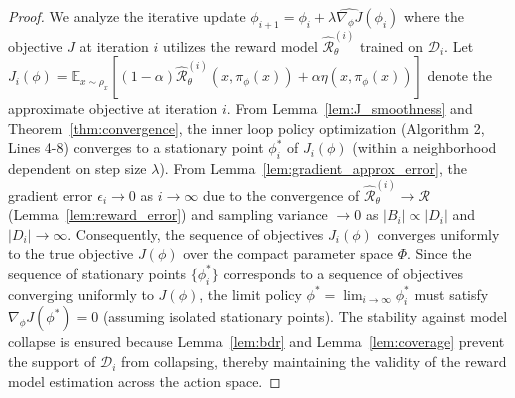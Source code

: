 \documentclass[./dissertation.tex]{subfiles}
\begin{document}
\begin{proof} 
We analyze the iterative update $\phi_{i+1} = \phi_i + \lambda \widehat{\nabla_\phi J}(\phi_i)$ where the objective $J$ at iteration $i$ utilizes the reward model $\hat{\mathcal{R}}_\theta^{(i)}$ trained on $\mathcal{D}_i$.
Let $J_i(\phi) = \mathbb{E}_{x \sim \rho_x} [ (1-\alpha)\hat{\mathcal{R}}_\theta^{(i)}(x, \pi_\phi(x)) + \alpha \eta(x, \pi_\phi(x)) ]$ denote the approximate objective at iteration $i$.
From Lemma~\ref{lem:J_smoothness} and Theorem~\ref{thm:convergence}, the inner loop policy optimization (Algorithm 2, Lines 4-8) converges to a stationary point $\phi^*_i$ of $J_i(\phi)$ (within a neighborhood dependent on step size $\lambda$).
From Lemma~\ref{lem:gradient_approx_error}, the gradient error 
$\epsilon_i \to 0$ as $i \to \infty$ due to the convergence of $\hat{\mathcal{R}}_\theta^{(i)} \to \mathcal{R}$ (Lemma~\ref{lem:reward_error}) and sampling variance $\to 0$ as $|B_i|\propto |D_i|$ and $|D_i|\to\infty$.
Consequently, the sequence of objectives $J_i(\phi)$ converges uniformly to the true objective $J(\phi)$ over the compact parameter space $\Phi$.
Since the sequence of stationary points $\{ \phi^*_i \}$ corresponds to a sequence of objectives converging uniformly to $J(\phi)$, the limit policy $\phi^* = \lim_{i \to \infty} \phi^*_i$ must satisfy $\nabla_\phi J(\phi^*) = 0$ (assuming isolated stationary points).
The stability against model collapse is ensured because Lemma~\ref{lem:bdr} and Lemma~\ref{lem:coverage} prevent the support of $\mathcal{D}_i$ from collapsing, thereby maintaining the validity of the reward model estimation across the action space.
\end{proof}
\end{document}
